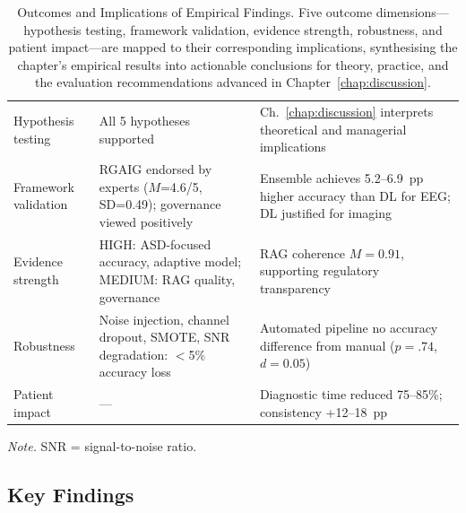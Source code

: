 \begin{table}[!htbp]
\tablestripes\tablefontsize
\caption[Outcomes and Implications]{Outcomes and Implications of Empirical Findings. Five outcome dimensions---hypothesis testing, framework validation, evidence strength, robustness, and patient impact---are mapped to their corresponding implications, synthesising the chapter's empirical results into actionable conclusions for theory, practice, and the evaluation recommendations advanced in Chapter~\ref{chap:discussion}.}
\tablefontsize
\begin{tabularx}{\textwidth}{@{} >{\raggedright\arraybackslash}p{1.8cm} L L @{}}
\toprule
{} &  &  \\
\midrule
Hypothesis testing & All 5 hypotheses supported & Ch.~\ref{chap:discussion} interprets theoretical and managerial implications \\
\addlinespace
Framework validation & RGAIG endorsed by experts ($M$=4.6/5, SD=0.49); governance viewed positively & Ensemble achieves 5.2--6.9~pp higher accuracy than DL for EEG; DL justified for imaging \\
\addlinespace
Evidence strength & HIGH: ASD-focused accuracy, adaptive model; MEDIUM: RAG quality, governance & RAG coherence $M=0.91$, supporting regulatory transparency \\
\addlinespace
Robustness & Noise injection, channel dropout, SMOTE, SNR degradation: $<$5\% accuracy loss & Automated pipeline no accuracy difference from manual ($p=.74$, $d=0.05$) \\
\addlinespace
Patient impact & --- & Diagnostic time reduced 75--85\%; consistency +12--18~pp \\
\bottomrule
\end{tabularx}
\vspace{0.5em}\noindent\textit{Note.} SNR = signal-to-noise ratio.
\end{table}

\iffalse
\subsection{Key Findings}

